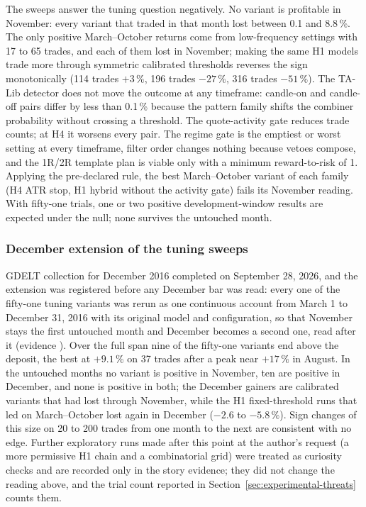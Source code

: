 The sweeps answer the tuning question negatively. No variant is profitable in November: every variant that traded in that month lost between 0.1 and 8.8\,\%. The only positive March--October returns come from low-frequency settings with 17 to 65 trades, and each of them lost in November; making the same H1 models trade more through symmetric calibrated thresholds reverses the sign monotonically (114 trades $+3\,\%$, 196 trades $-27\,\%$, 316 trades $-51\,\%$). The TA-Lib detector does not move the outcome at any timeframe: candle-on and candle-off pairs differ by less than 0.1\,\% because the pattern family shifts the combiner probability without crossing a threshold. The quote-activity gate reduces trade counts; at H4 it worsens every pair. The regime gate is the emptiest or worst setting at every timeframe, filter order changes nothing because vetoes compose, and the 1R/2R template plan is viable only with a minimum reward-to-risk of 1. Applying the pre-declared rule, the best March--October variant of each family (H4 ATR stop, H1 hybrid without the activity gate) fails its November reading. With fifty-one trials, one or two positive development-window results are expected under the null; none survives the untouched month.

\subsubsection{December extension of the tuning sweeps} \label{subsec:registered-followups}

GDELT collection for December 2016 completed on September 28, 2026, and the extension was registered before any December bar was read: every one of the fifty-one tuning variants was rerun as one continuous account from March 1 to December 31, 2016 with its original model and configuration, so that November stays the first untouched month and December becomes a second one, read after it (evidence ). Over the full span nine of the fifty-one variants end above the deposit, the best at $+9.1\,\%$ on 37 trades after a peak near $+17\,\%$ in August. In the untouched months no variant is positive in November, ten are positive in December, and none is positive in both; the December gainers are calibrated variants that had lost through November, while the H1 fixed-threshold runs that led on March--October lost again in December ($-2.6$ to $-5.8\,\%$). Sign changes of this size on 20 to 200 trades from one month to the next are consistent with no edge. Further exploratory runs made after this point at the author's request (a more permissive H1 chain and a combinatorial grid) were treated as curiosity checks and are recorded only in the story evidence; they did not change the reading above, and the trial count reported in Section~\ref{sec:experimental-threats} counts them.

